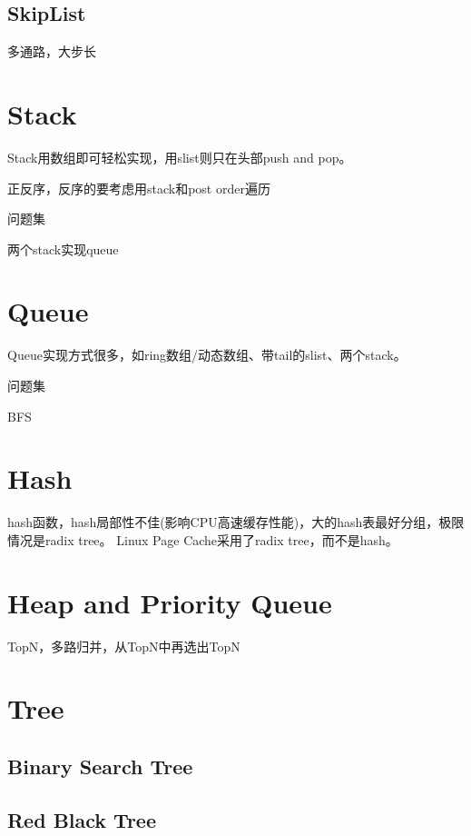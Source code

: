 \subsection{SkipList}

多通路，大步长

\section{Stack}

Stack用数组即可轻松实现，用slist则只在头部push and pop。

正反序，反序的要考虑用stack和post order遍历

问题集
\begin{enumbox}
\item 两个stack实现queue
\end{enumbox}

\section{Queue}

Queue实现方式很多，如ring数组/动态数组、带tail的slist、两个stack。

问题集
\begin{enumbox}
\item BFS
\end{enumbox}


\section{Hash}

hash函数，hash局部性不佳(影响CPU高速缓存性能)，大的hash表最好分组，极限情况是radix tree。
Linux Page Cache采用了radix tree，而不是hash。

\section{Heap and Priority Queue}

TopN，多路归并，从TopN中再选出TopN

\section{Tree}

\subsection{Binary Search Tree}

\subsection{Red Black Tree}

